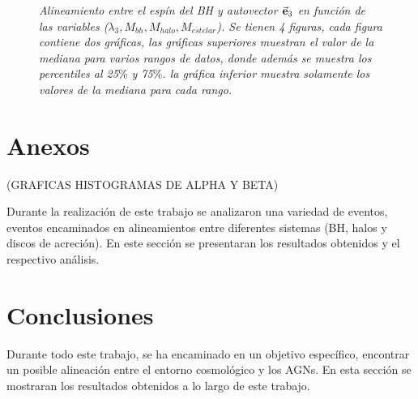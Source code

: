 \begin{figure}
\caption{\emph{Alineamiento entre el espín del BH y autovector $\vec{\bf{e}}_3$ en función de las variables ($\lambda_{3}, M_{bh}, M_{halo}, M_{estelar}$). Se tienen 4 figuras, cada figura contiene dos gráficas, las gráficas superiores muestran el valor de la mediana para varios rangos de datos, donde además se muestra los percentiles al 25$\%$ y 75$\%$. la gráfica inferior muestra solamente los valores de la mediana para cada rango.} }
\label{fig: median dispercion} 
\end{figure}


\newpage
\section{Anexos}
\label{sec: anexos}
(GRAFICAS HISTOGRAMAS DE ALPHA Y BETA)

Durante la realización de este trabajo se analizaron una variedad de eventos, eventos encaminados en alineamientos entre diferentes sistemas (BH, halos y discos de acreción). En este sección se presentaran los resultados obtenidos y el respectivo análisis.




\newpage
\section{Conclusiones}
\label{sec: conclusiones}
Durante todo este trabajo, se ha encaminado en un objetivo específico, encontrar un posible alineación entre el entorno cosmológico y los AGNs. En esta sección se mostraran los resultados obtenidos a lo largo de este trabajo.

